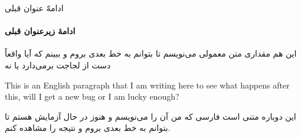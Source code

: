 \documentclass{bidibeamer}
\newenvironment{latin}{\begin{LTR}\rmfamily}{\end{LTR}}
\begin{document}
\begin{frame}{ادامهّ عنوان قبلی}
\framesubtitle{ادامهٔ زیرعنوان قبلی}
این هم مقداری متن معمولی می‌نویسم تا بتوانم به خط بعدی بروم و ببینم که آیا واقعاً  دست از لجاجت برمی‌دارد یا نه
\begin{latin}
This is an English paragraph that I am writing here to see what happens after this, will I get a new bug or I am lucky enough?
\end{latin}
این دوباره متنی است فارسی که من آن را می‌نویسم و هنوز در حال آزمایش هستم تا بتوانم به خط بعدی بروم و نتیجه را مشاهده کنم.
\end{frame}
\end{document}
